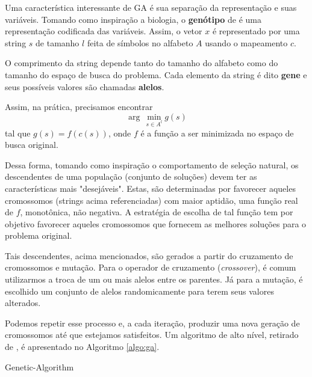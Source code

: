\documentclass[11pt]{article}
\begin{document}
Uma característica interessante de GA é sua separação da representação e suas variáveis. Tomando como inspiração a biologia, o \textbf{genótipo} de é uma representação codificada das variáveis. Assim, o vetor \(x\) é representado por uma string \(s\) de tamanho \(l\) feita de símbolos no alfabeto \(A\) usando o mapeamento \(c\).

O comprimento da string depende tanto do tamanho do alfabeto como do tamanho do espaço de busca do problema. Cada elemento da string é dito \textbf{gene} e seus possíveis valores são chamadas \textbf{alelos}.

Assim, na prática, precisamos encontrar
\[ \arg\, \min \limits_{s \in A^{l}} g(s) \]
tal que \(g(s) = f(c(s))\), onde \(f\) é a função a ser minimizada no espaço de busca original.

Dessa forma, tomando como inspiração o comportamento de seleção natural, os descendentes de uma população (conjunto de soluções) devem ter as características mais "desejáveis". Estas, são determinadas por favorecer aqueles cromossomos (strings acima referenciadas) com maior aptidão, uma função real de \(f\), monotônica, não negativa. A estratégia de escolha de tal função tem por objetivo favorecer aqueles cromossomos que fornecem as melhores soluções para o problema original.

Tais descendentes, acima mencionados, são gerados a partir do cruzamento de cromossomos e mutação. Para o operador de cruzamento (\emph{crossover}), é comum utilizarmos a troca de um ou mais alelos entre os parentes. Já para a mutação, é escolhido um conjunto de alelos randomicamente para terem seus valores alterados.

Podemos repetir esse processo e, a cada iteração, produzir uma nova geração de cromossomos até que estejamos satisfeitos. Um algoritmo de alto nível, retirado de \cite{bib:genetic-algorithm}, é apresentado no Algoritmo \ref{algo:ga}.

\begin{algorithm}
    \caption{Genetic-Algorithm}
    \label{algo:ga}
    \begin{algorithmic}[1]
                \EndIf
                \EndIf
            \EndWhile
        \EndWhile
    \end{algorithmic}
\end{algorithm}
\end{document}
